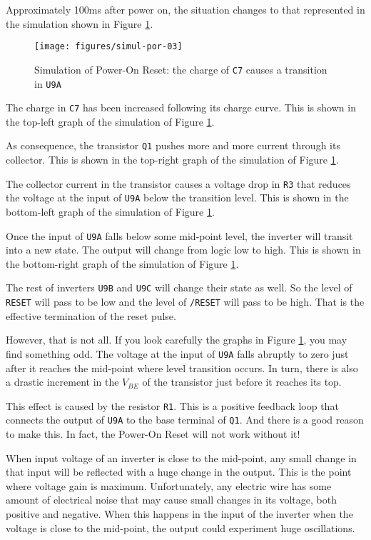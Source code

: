 Approximately 100ms after power on, the situation changes to that represented in the simulation shown in Figure \ref{fig:simul-por-03}.

\begin{figure}[htb]
  \centering
  \texttt{[image: figures/simul-por-03]}
  \caption{Simulation of Power-On Reset: the charge of {\tt C7} causes a transition in {\tt U9A}}
  \label{fig:simul-por-03}
\end{figure}

The charge in {\tt C7} has been increased following its charge curve. This is shown in the top-left graph of the simulation of Figure \ref{fig:simul-por-03}.

As consequence, the transistor {\tt Q1} pushes more and more current through its collector. This is shown in the top-right graph of the simulation of Figure \ref{fig:simul-por-03}.

The collector current in the transistor causes a voltage drop in {\tt R3} that reduces the voltage at the input of {\tt U9A} below the transition level. This is shown in the bottom-left graph of the simulation of Figure \ref{fig:simul-por-03}.

Once the input of {\tt U9A} falls below some mid-point level, the inverter will transit into a new state. The output will change from logic low to high. This is shown in the bottom-right graph of the simulation of Figure \ref{fig:simul-por-03}.

The rest of inverters {\tt U9B} and {\tt U9C} will change their state as well. So the level of {\tt RESET} will pass to be low and the level of {\tt /RESET} will pass to be high. That is the effective termination of the reset pulse.

However, that is not all. If you look carefully the graphs in Figure \ref{fig:simul-por-03}, you may find something odd. The voltage at the input of {\tt U9A} falls abruptly to zero just after it reaches the mid-point where level transition occurs. In turn, there is also a drastic increment in the $V_{BE}$ of the transistor just before it reaches its top.

This effect is caused by the resistor {\tt R1}. This is a positive feedback loop that connects the output of {\tt U9A} to the base terminal of {\tt Q1}. And there is a good reason to make this. In fact, the Power-On Reset will not work without it!

When input voltage of an inverter is close to the mid-point, any small change in that input will be reflected with a huge change in the output. This is the point where voltage gain is maximum. Unfortunately, any electric wire has some amount of electrical noise that may cause small changes in its voltage, both positive and negative. When this happens in the input of the inverter when the voltage is close to the mid-point, the output could experiment huge oscillations.

